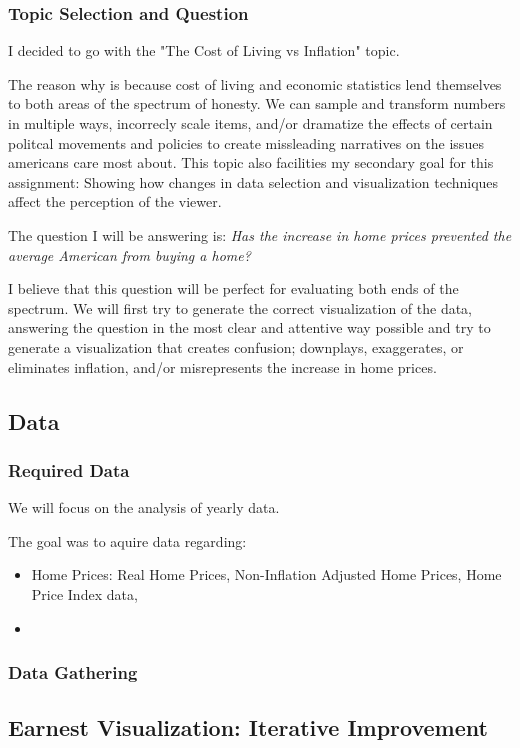 \documentclass{article}
\begin{document}
\subsubsection{Topic Selection and Question}

I decided to go with the "The Cost of Living vs Inflation" topic.

The reason why is because cost of living and economic statistics lend themselves to 
both areas of the spectrum of honesty. We can sample and transform numbers 
in multiple ways, incorrecly scale items, and/or dramatize the effects of 
certain politcal movements and policies to create missleading narratives 
on the issues americans care most about. This topic also facilities my secondary goal
for this assignment: Showing how changes in data selection and visualization techniques
affect the perception of the viewer.

The question I will be answering is: 
\textit{Has the increase in home prices prevented the average American from buying a home?}

I believe that this question will be perfect for evaluating both ends of the spectrum.
We will first try to generate the correct visualization of the data, answering the question
in the most clear and attentive way possible and try to generate a
visualization that creates confusion; downplays, exaggerates, or eliminates inflation,
and/or misrepresents the increase in home prices.

\subsection{Data}
\subsubsection{Required Data}
We will focus on the analysis of yearly data.

The goal was to aquire data regarding:
\begin{itemize}
  \item Home Prices: Real Home Prices, Non-Inflation Adjusted Home Prices, Home Price
  Index data, 
  \item 
\end{itemize}

\subsubsection{Data Gathering}

\subsection{Earnest Visualization: Iterative Improvement}
\end{document}

